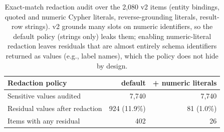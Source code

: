 \begin{table}[t]
\centering
\footnotesize
\begin{tabular}{@{}lrr@{}}
\toprule
Redaction policy & default & + numeric literals \\
\midrule
Sensitive values audited & 7,740 & 7,740 \\
Residual values after redaction & 924 (11.9\%) & 81 (1.0\%) \\
Items with any residual & 402 & 26 \\
\bottomrule
\end{tabular}
\caption{Exact-match redaction audit over the 2,080 v2 items (entity bindings, quoted and numeric Cypher literals, reverse-grounding literals, result-row strings). v2 grounds many slots on numeric identifiers, so the default policy (strings only) leaks them; enabling numeric-literal redaction leaves residuals that are almost entirely schema identifiers returned as values (e.g., label names), which the policy does not hide by design.}
\label{tab:redaction}
\end{table}
